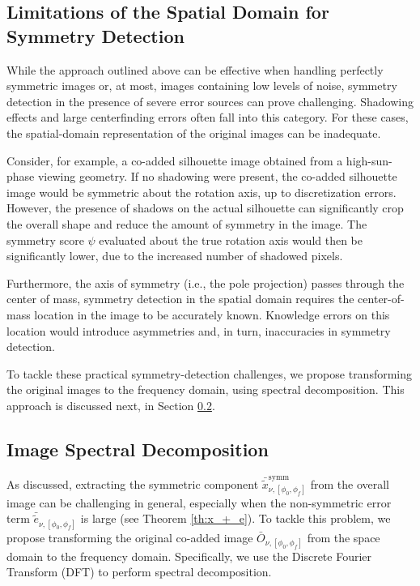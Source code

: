 \subsection{Limitations of the Spatial Domain for Symmetry Detection}
\label{sec:limitations_spatial_domain}
While the approach outlined above can be effective when handling perfectly symmetric images or, at most, images containing low levels of noise, symmetry detection in the presence of severe error sources can prove challenging. Shadowing effects and large centerfinding errors often fall into this category. For these cases, the spatial-domain representation of the original images can be inadequate. 

Consider, for example, a co-added silhouette image obtained from a high-sun-phase viewing geometry. If no shadowing were present, the co-added silhouette image would be symmetric about the rotation axis, up to discretization errors. However, the presence of shadows on the actual silhouette can significantly crop the overall shape and reduce the amount of symmetry in the image. The symmetry score $\psi$ evaluated about the true rotation axis would then be significantly lower, due to the increased number of shadowed pixels.

Furthermore, the axis of symmetry (i.e., the pole projection) passes through the center of mass, symmetry detection in the spatial domain requires the center-of-mass location in the image to be accurately known. Knowledge errors on this location would introduce asymmetries and, in turn, inaccuracies in symmetry detection.

To tackle these practical symmetry-detection challenges, we propose transforming the original images to the frequency domain, using spectral decomposition. This approach is discussed next, in Section \ref{sec:fourier}.

\subsection{Image Spectral Decomposition}
\label{sec:fourier}

As discussed, extracting the symmetric component $\bar{\tilde{x}}^{\mathrm{symm}}_{\nu,[\phi_0,\phi_f]}$ from the overall image can be challenging in general, especially when the non-symmetric error term $\bar{\tilde{e}}_{\nu,[\phi_0,\phi_f]}$ is large (see Theorem \ref{th:x_+_e}). To tackle this problem, we propose transforming the original co-added image $\bar{O}_{\nu,[\phi_0,\phi_f]}$ from the space domain to the frequency domain. Specifically, we use the Discrete Fourier Transform (DFT) to perform spectral decomposition\cite{brigham1988fast}.

